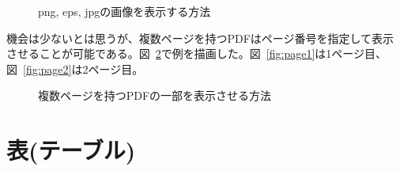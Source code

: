 \documentclass[a4j,openany,11px]{jsbook}
\begin{document}
\begin{figure}[htbp]
\caption{png, eps, jpgの画像を表示する方法\label{fig:various_img}}
\end{figure}

機会は少ないとは思うが、複数ページを持つPDFはページ番号を指定して表示させることが可能である。図~\ref{fig:multi_page}で例を描画した。図~\ref{fig:page1}は1ページ目、図~\ref{fig:page2}は2ページ目。

\begin{figure}[htbp]
\centering
{}
\hspace{1em}
\caption{複数ページを持つPDFの一部を表示させる方法\label{fig:multi_page}}
\end{figure}

\clearpage

\chapter{表(テーブル)}
\end{document}
